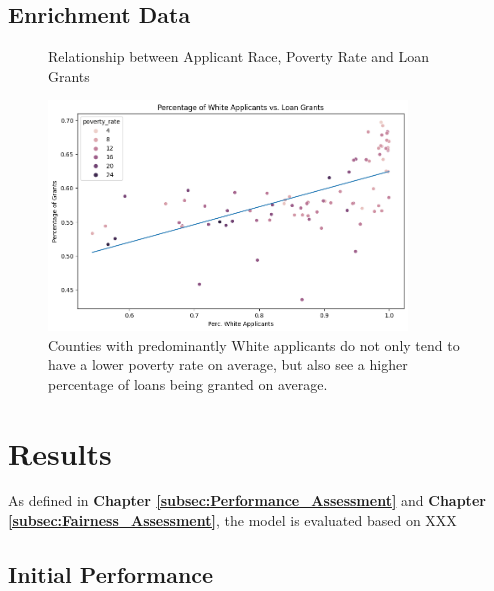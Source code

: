 \subsection{Enrichment Data}\label{subsec:Enrichment_Data}



\begin{figure}[h]
    \centering
    \caption{Relationship between Applicant Race, Poverty Rate and Loan Grants}
    \includegraphics[width=0.85\textwidth]{images/CHXX_Perc_Grants_vs_Perc_White.png}
    \caption*{Counties with predominantly White applicants do not only tend to have a lower poverty rate on average, but also see a higher percentage of loans being granted on average.}
    \label{fig:Scatter_White_Applicants_Loan_Grant}
\end{figure}

\section{Results}\label{sec:Results}        

As defined in \textbf{Chapter \ref{subsec:Performance_Assessment}} and \textbf{Chapter \ref{subsec:Fairness_Assessment}}, the model is evaluated based on XXX



\subsection{Initial Performance}\label{subsec:Initial_Performance}


